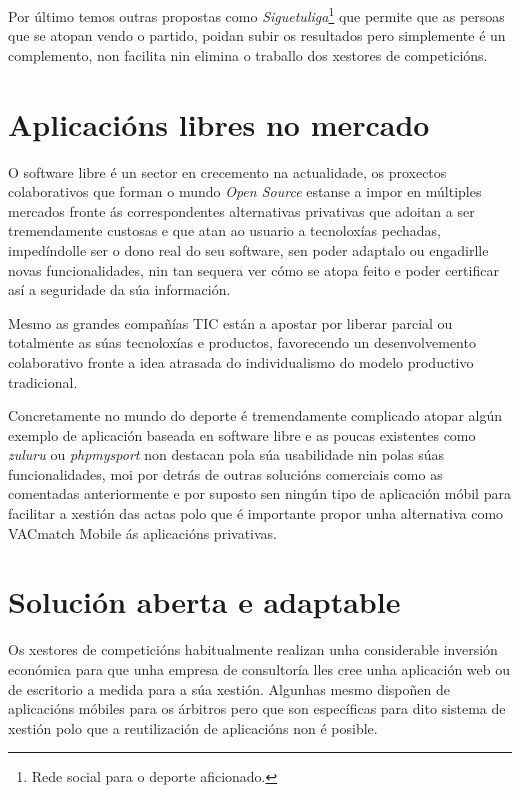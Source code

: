     Por último temos outras propostas como \emph{Siguetuliga}\footnote{Rede 
social para o deporte aficionado.} que permite que as persoas que se atopan 
vendo o partido, poidan subir os resultados pero simplemente é un complemento, 
non facilita nin elimina o traballo dos xestores de competicións.

  \section{Aplicacións libres no mercado}

    O software libre é un sector en crecemento na actualidade, os proxectos 
colaborativos que forman o mundo \emph{Open Source} estanse a impor en múltiples 
mercados fronte ás correspondentes alternativas privativas que adoitan a ser 
tremendamente custosas e que atan ao usuario a tecnoloxías pechadas, 
impedíndolle ser o dono real do seu software, sen poder adaptalo ou engadirlle 
novas funcionalidades, nin tan sequera ver cómo se atopa feito e poder 
certificar así a seguridade da súa información.

    Mesmo as grandes compañías TIC están a apostar por liberar parcial ou totalmente as 
súas tecnoloxías e productos, favorecendo un desenvolvemento colaborativo fronte a idea 
atrasada do individualismo do modelo productivo tradicional.

    Concretamente no mundo do deporte é tremendamente complicado atopar algún 
exemplo de aplicación baseada en software libre e as poucas existentes como 
\emph{zuluru} ou \emph{phpmysport} non destacan pola súa usabilidade nin polas 
súas funcionalidades, moi por detrás de outras solucións comerciais como as 
comentadas anteriormente e por suposto sen ningún tipo de aplicación móbil 
para facilitar a xestión das actas polo que é importante propor unha 
alternativa como VACmatch Mobile ás aplicacións privativas.

  \section{Solución aberta e adaptable}

  Os xestores de competicións habitualmente realizan unha considerable inversión 
económica para que unha empresa de consultoría lles cree unha aplicación web ou de 
escritorio a medida para a súa xestión. Algunhas mesmo dispoñen de aplicacións móbiles 
para os árbitros pero que son específicas para dito sistema de xestión polo que a 
reutilización de aplicacións non é posible.

